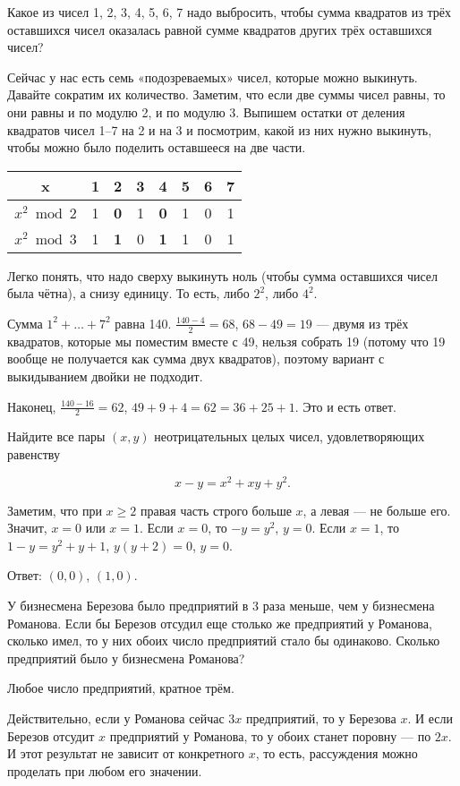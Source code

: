 
\begin{itemize}

\itA Какое из чисел 1, 2, 3, 4, 5, 6, 7 надо выбросить, чтобы сумма квадратов из трёх оставшихся чисел оказалась равной сумме квадратов других трёх оставшихся чисел?

\itr Сейчас у нас есть семь «подозреваемых» чисел, которые можно выкинуть. Давайте сократим их количество. Заметим, что если две суммы чисел равны, то они равны и по модулю 2, и по модулю 3. Выпишем остатки от деления квадратов чисел 1–7 на 2 и на 3 и посмотрим, какой из них нужно выкинуть, чтобы можно было поделить оставшееся на две части.

\begin{center} \begin{tabular}{|c|c|c|c|c|c|c|c|}
	\hline
	x & 1 & \bf 2 & 3 & \bf 4 & 5 & 6 & 7 \\ \hline
	$x^2 \bmod 2$ & 1 & \bf 0 & 1 & \bf 0 & 1 & 0 & 1\\ \hline
	$x^2 \bmod 3$ & 1 & \bf 1 & 0 & \bf 1 & 1 & 0 & 1\\ \hline
\end{tabular} \end{center}

Легко понять, что надо сверху выкинуть ноль (чтобы сумма оставшихся чисел была чётна), а снизу единицу. То есть, либо $2^2$, либо $4^2$.

Сумма $1^2 + \ldots + 7^2$ равна 140. $\tfrac{140-4}{2}=68$, $68-49=19$ — двумя из трёх квадратов, которые мы поместим вместе с 49, нельзя собрать 19 (потому что 19 вообще не получается как сумма двух квадратов), поэтому вариант с выкидыванием двойки не подходит.

Наконец, $\tfrac{140-16}{2} = 62$, $49+9+4=62=36+25+1$. Это и есть ответ.

\itC Найдите все пары $(x, y)$ неотрицательных целых чисел, удовлетворяющих равенству

$$x-y=x^2+xy+y^2.$$

\itr Заметим, что при $x \ge 2$ правая часть строго больше $x$, а левая — не больше его. Значит, $x=0$ или $x=1$. Если $x=0$, то $-y = y^2$, $y=0$. Если $x=1$, то $1-y=y^2+y+1$, $y(y+2)=0$, $y=0$.

Ответ: $(0,0)$, $(1,0)$.
\end{itemize}


\begin{itemize}
\itA У бизнесмена Березова было предприятий в 3 раза меньше, чем у бизнесмена Романова. Если бы Березов отсудил еще столько же предприятий у Романова, сколько имел, то у них обоих число предприятий стало бы одинаково. Сколько предприятий было у бизнесмена Романова?

\itr Любое число предприятий, кратное трём.

Действительно, если у Романова сейчас $3x$ предприятий, то у Березова $x$. И если Березов отсудит $x$ предприятий у Романова, то у обоих станет поровну — по $2x$. И этот результат не зависит от конкретного $x$, то есть, рассуждения можно проделать при любом его значении.
\end{itemize}